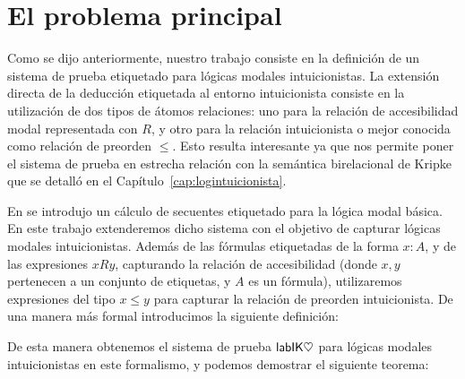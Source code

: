 \section{El problema principal}

Como se dijo anteriormente, nuestro trabajo consiste en la definición de un sistema de prueba etiquetado para lógicas modales intuicionistas. La extensión directa de la deducción etiquetada al entorno intuicionista consiste en la utilización de dos tipos de átomos relaciones: uno para la relación de accesibilidad modal representada con $R$, y otro para la relación intuicionista o mejor conocida como relación de preorden $\le$. Esto resulta interesante ya que nos permite poner el sistema de prueba en estrecha relación con la semántica birelacional de Kripke que se detalló en el Capítulo~\ref{cap:logintuicionista}.

En \cite{negri2005} se introdujo un cálculo de secuentes etiquetado para la lógica modal básica. En este trabajo extenderemos dicho sistema con el objetivo de capturar lógicas modales intuicionistas. Además de las fórmulas etiquetadas de la forma $x \colon A$, y de las expresiones $xRy$, capturando la relación de accesibilidad (donde $x, y$ pertenecen a un conjunto de etiquetas, y $A$ es un fórmula), utilizaremos expresiones del tipo $x \le y$ para capturar la relación de preorden intuicionista. De una manera más formal introducimos la siguiente definición:





\vspace{2mm}

De esta manera obtenemos el sistema de prueba $\mathsf{labIK\heartsuit}$ para lógicas modales intuicionistas en este formalismo, y podemos demostrar el siguiente teorema:

